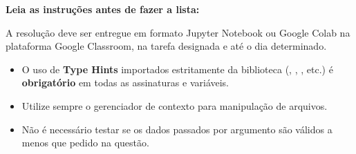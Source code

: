 
\vspace{1cm}

\noindent  \textbf{Leia as instruções antes de fazer a lista:}

\vspace{0.3cm}
\noindent A resolução deve ser entregue em formato Jupyter Notebook ou Google Colab na plataforma Google Classroom, na tarefa designada e até o dia determinado.

\noindent
\begin{itemize}
    \item O uso de \textbf{Type Hints} importados estritamente da biblioteca  (, , , etc.) é \textbf{obrigatório} em todas as assinaturas e variáveis.
    \item Utilize sempre o gerenciador de contexto  para manipulação de arquivos.
    \item Não é necessário testar se os dados passados por argumento são válidos a menos que pedido na questão.
\end{itemize}
\vspace{0.5cm}


